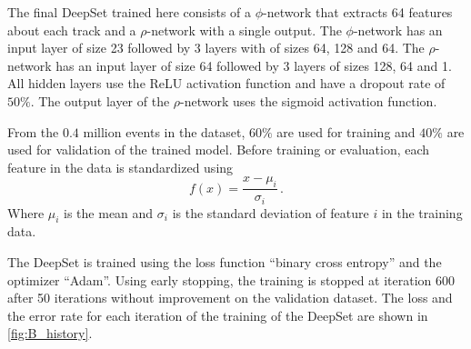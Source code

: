 The final DeepSet trained here consists of a $\phi$-network that extracts 64 features about each track and a $\rho$-network with a single output.
The $\phi$-network has an input layer of size 23 followed by 3 layers with of sizes 64, 128 and 64.
The $\rho$-network has an input layer of size 64 followed by 3 layers of sizes 128, 64 and 1.
All hidden layers use the ReLU activation function and have a dropout rate of $50\%$.
The output layer of the $\rho$-network uses the sigmoid activation function.

From the $0.4$ million events in the dataset, $60\%$ are used for training and $40\%$ are used for validation of the trained model.
Before training or evaluation, each feature in the data is standardized using 
\begin{equation*}
    f(x) = \frac{x - \mu_i}{\sigma_i} \, .
\end{equation*} 
Where $\mu_i$ is the mean and $\sigma_i$ is the standard deviation of feature $i$ in the training data.

The DeepSet is trained using the loss function \enquote{binary cross entropy} and the optimizer \enquote{Adam}.
Using early stopping, the training is stopped at iteration 600 after 50 iterations without improvement on the validation dataset.
The loss and the error rate for each iteration of the training of the DeepSet are shown in \cref{fig:B_history}.

